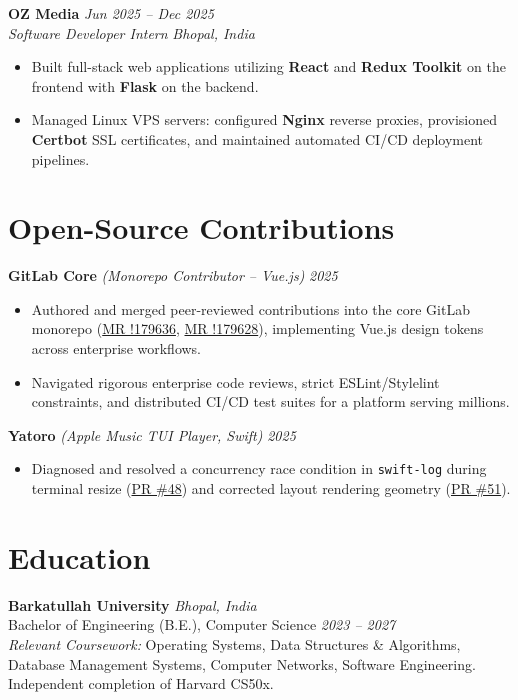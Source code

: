 \documentclass[10pt,a4paper]{article}
\begin{document}
\textbf{OZ Media} \hfill \textit{Jun 2025 -- Dec 2025} \\
\textit{Software Developer Intern} \hfill \textit{Bhopal, India}
\begin{itemize}
    \item Built full-stack web applications utilizing \textbf{React} and \textbf{Redux Toolkit} on the frontend with \textbf{Flask} on the backend.
    \item Managed Linux VPS servers: configured \textbf{Nginx} reverse proxies, provisioned \textbf{Certbot} SSL certificates, and maintained automated CI/CD deployment pipelines.
\end{itemize}

\section{Open-Source Contributions}
\textbf{GitLab Core} \textit{(Monorepo Contributor -- Vue.js)} \hfill \textit{2025}
\begin{itemize}
    \item Authored and merged peer-reviewed contributions into the core GitLab monorepo (\href{https://gitlab.com/gitlab-org/gitlab/-/merge_requests/179636}{MR !179636}, \href{https://gitlab.com/gitlab-org/gitlab/-/merge_requests/179628}{MR !179628}), implementing Vue.js design tokens across enterprise workflows.
    \item Navigated rigorous enterprise code reviews, strict ESLint/Stylelint constraints, and distributed CI/CD test suites for a platform serving millions.
\end{itemize}

\textbf{Yatoro} \textit{(Apple Music TUI Player, Swift)} \hfill \textit{2025}
\begin{itemize}
    \item Diagnosed and resolved a concurrency race condition in \texttt{swift-log} during terminal resize (\href{https://github.com/jayadamsmorgan/Yatoro/pull/48}{PR \#48}) and corrected layout rendering geometry (\href{https://github.com/jayadamsmorgan/Yatoro/pull/51}{PR \#51}).
\end{itemize}

\section{Education}
\textbf{Barkatullah University} \hfill \textit{Bhopal, India} \\
Bachelor of Engineering (B.E.), Computer Science \hfill \textit{2023 -- 2027} \\
\textit{Relevant Coursework:} Operating Systems, Data Structures \& Algorithms, Database Management Systems, Computer Networks, Software Engineering. Independent completion of Harvard CS50x.
\end{document}
